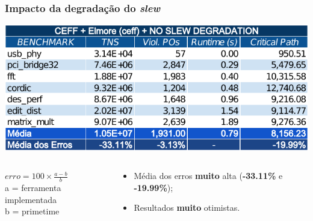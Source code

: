 \documentclass[10pt,a4paper]{beamer}
\begin{document}
		\begin{frame}[t]
			\frametitle{Impacto da degradação do \textit{slew}}
			\vspace{-.5cm}
			\begin{center}
				\includegraphics[width=\linewidth]{img/ceff_elmore_no_slew.pdf}
			\end{center}
			\vspace{-.5cm}
			\begin{columns}
				\begin{column}{0.4\textwidth}
					\begin{shaded}
						$erro = 100 \times \frac{a - b}{ b } $ \\
						\small{a = ferramenta implementada} \\
						\small{b = primetime}
					\end{shaded}
				\end{column}
				\begin{column}{0.6\textwidth}
					\begin{itemize}
						\item Média dos erros \textbf{muito} alta (\textbf{-33.11\%} e \textbf{-19.99\%});
						\item Resultados \textbf{muito} otimistas.
					\end{itemize}
				\end{column}
			\end{columns}	
			
		\end{frame}
		
\end{document}
